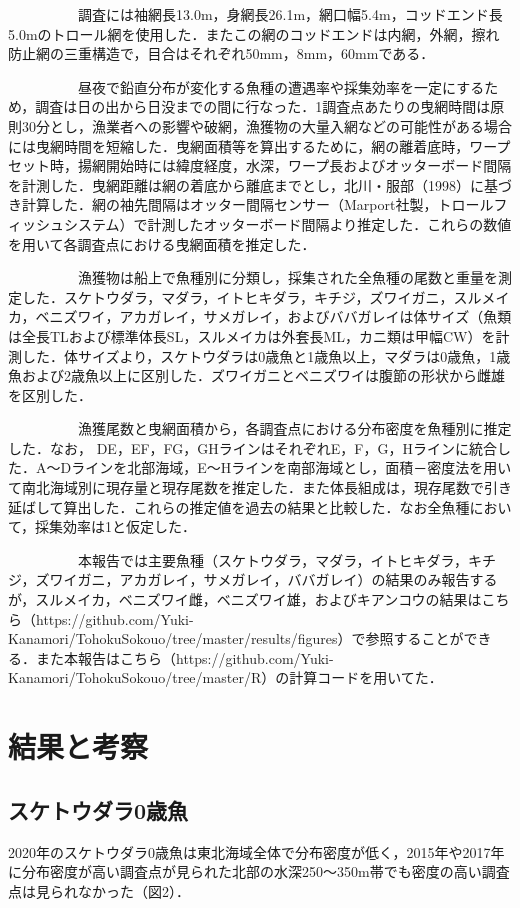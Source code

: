 \documentclass[11pt]{article} %
\begin{document}
\begin{linenumbers}
\ \ \ \ \ \ \ \ \ \ 
調査には袖網長13.0m，身網長26.1m，網口幅5.4m，コッドエンド長5.0mのトロール網を使用した．またこの網のコッドエンドは内網，外網，擦れ防止網の三重構造で，目合はそれぞれ50mm，8mm，60mmである．

\ \ \ \ \ \ \ \ \ \ 
昼夜で鉛直分布が変化する魚種の遭遇率や採集効率を一定にするため，調査は日の出から日没までの間に行なった．1調査点あたりの曳網時間は原則30分とし，漁業者への影響や破網，漁獲物の大量入網などの可能性がある場合には曳網時間を短縮した．曳網面積等を算出するために，網の離着底時，ワープセット時，揚網開始時には緯度経度，水深，ワープ長およびオッターボード間隔を計測した．曳網距離は網の着底から離底までとし，北川・服部（1998）に基づき計算した．網の袖先間隔はオッター間隔センサー（Marport社製，トロールフィッシュシステム）で計測したオッターボード間隔より推定した．これらの数値を用いて各調査点における曳網面積を推定した．

\ \ \ \ \ \ \ \ \ \ 
漁獲物は船上で魚種別に分類し，採集された全魚種の尾数と重量を測定した．スケトウダラ，マダラ，イトヒキダラ，キチジ，ズワイガニ，スルメイカ，ベニズワイ，アカガレイ，サメガレイ，およびババガレイは体サイズ（魚類は全長TLおよび標準体長SL，スルメイカは外套長ML，カニ類は甲幅CW）を計測した．体サイズより，スケトウダラは0歳魚と1歳魚以上，マダラは0歳魚，1歳魚および2歳魚以上に区別した．ズワイガニとベニズワイは腹節の形状から雌雄を区別した．

\ \ \ \ \ \ \ \ \ \ 
漁獲尾数と曳網面積から，各調査点における分布密度を魚種別に推定した．なお， DE，EF，FG，GHラインはそれぞれE，F，G，Hラインに統合した．A～Dラインを北部海域，E～Hラインを南部海域とし，面積－密度法を用いて南北海域別に現存量と現存尾数を推定した．また体長組成は，現存尾数で引き延ばして算出した．これらの推定値を過去の結果と比較した．なお全魚種において，採集効率は1と仮定した．

\ \ \ \ \ \ \ \ \ \ 
本報告では主要魚種（スケトウダラ，マダラ，イトヒキダラ，キチジ，ズワイガニ，アカガレイ，サメガレイ，ババガレイ）の結果のみ報告するが，スルメイカ，ベニズワイ雌，ベニズワイ雄，およびキアンコウの結果はこちら（https://github.com/Yuki-Kanamori/TohokuSokouo/tree/master/results/figures）で参照することができる．また本報告はこちら（https://github.com/Yuki-Kanamori/TohokuSokouo/tree/master/R）の計算コードを用いてた．

\section{結果と考察}
\subsection{スケトウダラ0歳魚}
2020年のスケトウダラ0歳魚は東北海域全体で分布密度が低く，2015年や2017年に分布密度が高い調査点が見られた北部の水深250～350m帯でも密度の高い調査点は見られなかった（図2）．


\end{linenumbers}
\end{document}
